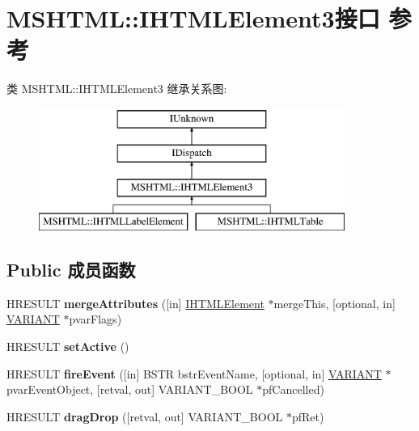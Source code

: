 \hypertarget{interface_m_s_h_t_m_l_1_1_i_h_t_m_l_element3}{}\section{M\+S\+H\+T\+ML\+:\+:I\+H\+T\+M\+L\+Element3接口 参考}
\label{interface_m_s_h_t_m_l_1_1_i_h_t_m_l_element3}
类 M\+S\+H\+T\+ML\+:\+:I\+H\+T\+M\+L\+Element3 继承关系图\+:\begin{figure}[H]
\begin{center}
\leavevmode
\includegraphics[height=4.000000cm]{interface_m_s_h_t_m_l_1_1_i_h_t_m_l_element3}
\end{center}
\end{figure}
\subsection*{Public 成员函数}
\begin{DoxyCompactItemize}
\item 
\mbox{\label{interface_m_s_h_t_m_l_1_1_i_h_t_m_l_element3_ae67a5dae5a69efb8b2ba27ea38e96039}} 
H\+R\+E\+S\+U\+LT {\bfseries merge\+Attributes} (\mbox{[}in\mbox{]} \hyperlink{interface_m_s_h_t_m_l_1_1_i_h_t_m_l_element}{I\+H\+T\+M\+L\+Element} $\ast$merge\+This, \mbox{[}optional, in\mbox{]} \hyperlink{structtag_v_a_r_i_a_n_t}{V\+A\+R\+I\+A\+NT} $\ast$pvar\+Flags)
\item 
\mbox{\label{interface_m_s_h_t_m_l_1_1_i_h_t_m_l_element3_a70b960980adcf737f59377580e27023e}} 
H\+R\+E\+S\+U\+LT {\bfseries set\+Active} ()
\item 
\mbox{\label{interface_m_s_h_t_m_l_1_1_i_h_t_m_l_element3_ad0b45bb3965c3920e32c26e477b7d985}} 
H\+R\+E\+S\+U\+LT {\bfseries fire\+Event} (\mbox{[}in\mbox{]} B\+S\+TR bstr\+Event\+Name, \mbox{[}optional, in\mbox{]} \hyperlink{structtag_v_a_r_i_a_n_t}{V\+A\+R\+I\+A\+NT} $\ast$pvar\+Event\+Object, \mbox{[}retval, out\mbox{]} V\+A\+R\+I\+A\+N\+T\+\_\+\+B\+O\+OL $\ast$pf\+Cancelled)
\item 
\mbox{\label{interface_m_s_h_t_m_l_1_1_i_h_t_m_l_element3_ae2d2ebefa0b1373aa5aa16e404e9c637}} 
H\+R\+E\+S\+U\+LT {\bfseries drag\+Drop} (\mbox{[}retval, out\mbox{]} V\+A\+R\+I\+A\+N\+T\+\_\+\+B\+O\+OL $\ast$pf\+Ret)
\end{DoxyCompactItemize}
